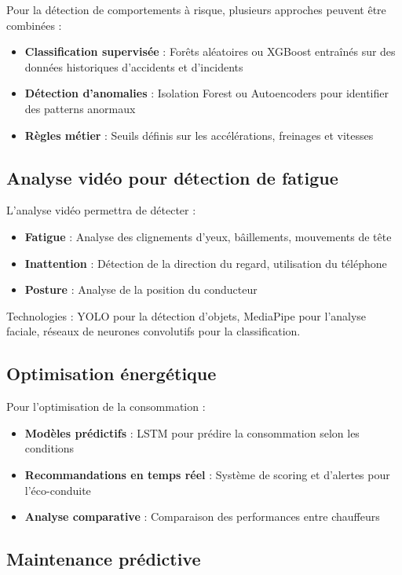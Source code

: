 \documentclass[a4paper, 12pt]{book}
\begin{document}
Pour la détection de comportements à risque, plusieurs approches peuvent être combinées :

\begin{itemize}
    \item \textbf{Classification supervisée} : Forêts aléatoires ou XGBoost entraînés sur des données historiques d'accidents et d'incidents
    \item \textbf{Détection d'anomalies} : Isolation Forest ou Autoencoders pour identifier des patterns anormaux
    \item \textbf{Règles métier} : Seuils définis sur les accélérations, freinages et vitesses
\end{itemize}

\subsection{Analyse vidéo pour détection de fatigue}

L'analyse vidéo permettra de détecter :
\begin{itemize}
    \item \textbf{Fatigue} : Analyse des clignements d'yeux, bâillements, mouvements de tête
    \item \textbf{Inattention} : Détection de la direction du regard, utilisation du téléphone
    \item \textbf{Posture} : Analyse de la position du conducteur
\end{itemize}

Technologies : YOLO pour la détection d'objets, MediaPipe pour l'analyse faciale, réseaux de neurones convolutifs pour la classification.

\subsection{Optimisation énergétique}

Pour l'optimisation de la consommation :
\begin{itemize}
    \item \textbf{Modèles prédictifs} : LSTM pour prédire la consommation selon les conditions
    \item \textbf{Recommandations en temps réel} : Système de scoring et d'alertes pour l'éco-conduite
    \item \textbf{Analyse comparative} : Comparaison des performances entre chauffeurs
\end{itemize}

\subsection{Maintenance prédictive}
\end{document}
